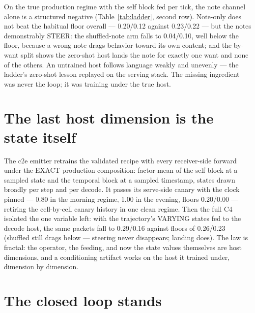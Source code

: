 \documentclass[11pt]{article}
\begin{document}
On the true production regime with the self block fed per tick, the
note channel alone is a structured negative
(Table~\ref{tab:ladder}, second row). Note-only does not beat the
habitual floor overall --- 0.20/0.12 against 0.23/0.22 --- but
the notes demonstrably STEER: the shuffled-note arm falls to
0.04/0.10, well below the floor, because a wrong note drags
behavior toward its own content; and the by-want split shows the
zero-shot host lands the note for exactly one want and none of the
others. An untrained host follows language weakly and unevenly --- the
ladder's zero-shot lesson replayed on the serving stack. The missing
ingredient was never the loop; it was training under the true host.

\section{The last host dimension is the state itself}

The c2e emitter retrains the validated recipe with every receiver-side
forward under the EXACT production composition: factor-mean of the
self block at a sampled state and the temporal block at a sampled
timestamp, states drawn broadly per step and per decode. It passes its
serve-side canary with the clock pinned --- 0.80 in the
morning regime, 1.00 in the evening, floors
0.20/0.00 --- retiring the cell-by-cell
canary history in one clean regime. Then the full C4 isolated the one
variable left: with the trajectory's VARYING states fed to the decode
host, the same packets fall to 0.29/0.16 against floors of
0.26/0.23 (shuffled still drags below --- steering never disappears;
landing does). The law is fractal: the operator, the feeding, and now
the state values themselves are host dimensions, and a conditioning
artifact works on the host it trained under, dimension by dimension.

\section{The closed loop stands}
\end{document}
